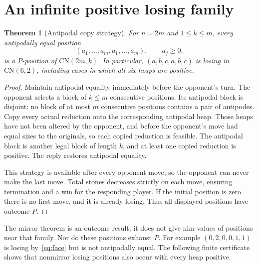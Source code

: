 \documentclass[11pt,a4paper]{article}
\newtheorem{theorem}{Theorem}[section]
\theoremstyle{definition}
\theoremstyle{remark}
\begin{document}
\section{An infinite positive losing family}
\begin{theorem}[Antipodal copy strategy]\label{th:mirror}
For $n=2m$ and $1\leq k\leq m$, every antipodally equal position
\[
 (a_1,\ldots,a_m,a_1,\ldots,a_m),\qquad a_j\geq0,
\]
is a $P$-position of $\mathrm{CN}(2m,k)$. In particular, $(a,b,c,a,b,c)$ is losing in $\mathrm{CN}(6,2)$, including cases in which all six heaps are positive.
\end{theorem}
\begin{proof}
Maintain antipodal equality immediately before the opponent's turn. The opponent selects a block of $k\leq m$ consecutive positions. Its antipodal block is disjoint: no block of at most $m$ consecutive positions contains a pair of antipodes. Copy every actual reduction onto the corresponding antipodal heap. Those heaps have not been altered by the opponent, and before the opponent's move had equal sizes to the originals, so each copied reduction is feasible. The antipodal block is another legal block of length $k$, and at least one copied reduction is positive. The reply restores antipodal equality.

This strategy is available after every opponent move, so the opponent can never make the last move. Total stones decreases strictly on each move, ensuring termination and a win for the responding player. If the initial position is zero there is no first move, and it is already losing. Thus all displayed positions have outcome $P$.
\end{proof}

The mirror theorem is an outcome result; it does not give nim-values of positions near that family. Nor do these positions exhaust $P$. For example $(0,2,0,0,1,1)$ is losing by~\eqref{eq:face} but is not antipodally equal. The following finite certificate shows that nonmirror losing positions also occur with every heap positive.
\end{document}
